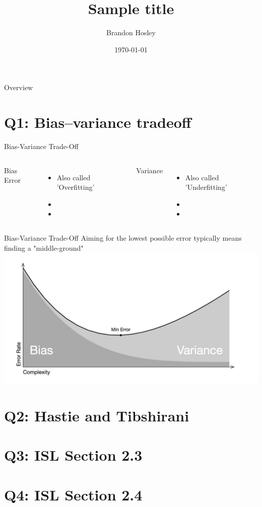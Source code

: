 \documentclass{beamer}
\title{Sample title}
\author{Brandon Hosley}
\institute{University of Illinois - Springfield}
\date{\today}
\begin{document}
\frame{\titlepage}

\begin{frame}{Overview}
\tableofcontents
\end{frame}

\section[Q1]{Q1: Bias–variance tradeoff}

\begin{frame}{Bias-Variance Trade-Off}
	\begin{columns}
		Bias Error
		\begin{itemize}
			\item<1-> Also called 'Overfitting'
			\item<3-> 
			\item<5-> 
		\end{itemize}
		
		Variance 
		\begin{itemize}
			\item<2-> Also called 'Underfitting'
			\item<4-> 
			\item<6-> 
		\end{itemize}
	\end{columns}
\end{frame}
\begin{frame}{Bias-Variance Trade-Off}
	Aiming for the lowest possible error typically means finding a "middle-ground" \\
	\includegraphics[width=0.5\linewidth]{MinError}
\end{frame}



\section{Q2: Hastie and Tibshirani}
\section{Q3: ISL Section 2.3}
\section{Q4: ISL Section 2.4}
\end{document}
